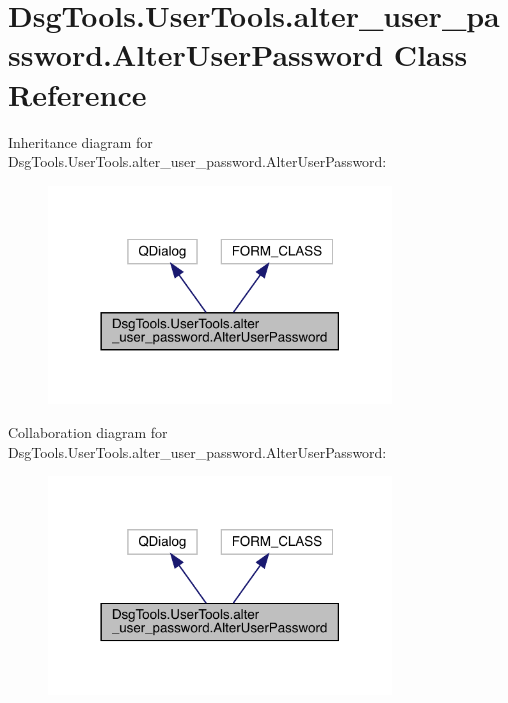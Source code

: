 \hypertarget{class_dsg_tools_1_1_user_tools_1_1alter__user__password_1_1_alter_user_password}{}\section{Dsg\+Tools.\+User\+Tools.\+alter\+\_\+user\+\_\+password.\+Alter\+User\+Password Class Reference}
\label{class_dsg_tools_1_1_user_tools_1_1alter__user__password_1_1_alter_user_password}


Inheritance diagram for Dsg\+Tools.\+User\+Tools.\+alter\+\_\+user\+\_\+password.\+Alter\+User\+Password\+:
\nopagebreak
\begin{figure}[H]
\begin{center}
\leavevmode
\includegraphics[width=258pt]{class_dsg_tools_1_1_user_tools_1_1alter__user__password_1_1_alter_user_password__inherit__graph}
\end{center}
\end{figure}


Collaboration diagram for Dsg\+Tools.\+User\+Tools.\+alter\+\_\+user\+\_\+password.\+Alter\+User\+Password\+:
\nopagebreak
\begin{figure}[H]
\begin{center}
\leavevmode
\includegraphics[width=258pt]{class_dsg_tools_1_1_user_tools_1_1alter__user__password_1_1_alter_user_password__coll__graph}
\end{center}
\end{figure}

